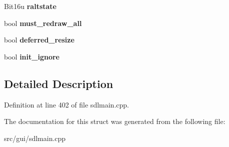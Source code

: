 \begin{DoxyCompactItemize}
\item 
\hypertarget{structSDL__Block_af7879512344af9287ab4b81097e0c726}{Bit16u {\bfseries raltstate}}\label{structSDL__Block_af7879512344af9287ab4b81097e0c726}

\item 
\hypertarget{structSDL__Block_aa0cb013ccdf7ee39c26ec18115431b1c}{bool {\bfseries must\-\_\-redraw\-\_\-all}}\label{structSDL__Block_aa0cb013ccdf7ee39c26ec18115431b1c}

\item 
\hypertarget{structSDL__Block_a079d996afce9d74628a5709b2f37bd2b}{bool {\bfseries deferred\-\_\-resize}}\label{structSDL__Block_a079d996afce9d74628a5709b2f37bd2b}

\item 
\hypertarget{structSDL__Block_af2f09abf4659afabea0f94eb03dfc63a}{bool {\bfseries init\-\_\-ignore}}\label{structSDL__Block_af2f09abf4659afabea0f94eb03dfc63a}

\end{DoxyCompactItemize}


\subsection{Detailed Description}


Definition at line 402 of file sdlmain.\-cpp.



The documentation for this struct was generated from the following file\-:\begin{DoxyCompactItemize}
\item 
src/gui/sdlmain.\-cpp\end{DoxyCompactItemize}
